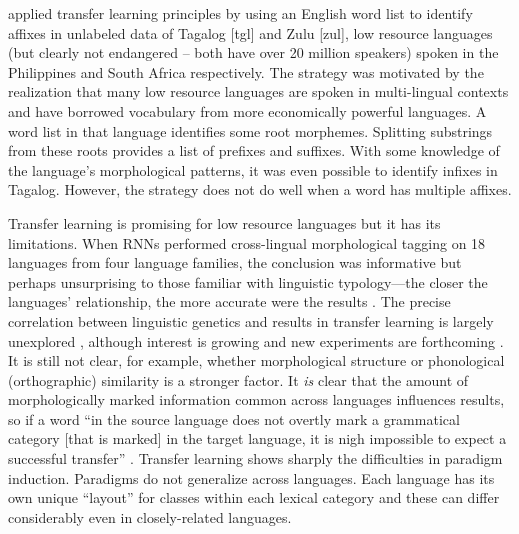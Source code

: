 \documentclass[12pt]{article}
\begin{document}
 applied transfer learning principles by using an English word list to identify affixes in unlabeled data of Tagalog [tgl] and Zulu [zul], low resource languages (but clearly not endangered -- both have over 20 million speakers) spoken in the Philippines and South Africa respectively. The strategy was motivated by the realization that many low resource languages are spoken in multi-lingual contexts and have borrowed vocabulary from more economically powerful languages. A word list in that language identifies some root morphemes. Splitting substrings from these roots provides a list of prefixes and suffixes. With some knowledge of the language's morphological patterns, it was even possible to identify infixes in Tagalog. However, the strategy does not do well when a word has multiple affixes. 

Transfer learning is promising for low resource languages but it has its limitations. When RNNs performed cross-lingual morphological tagging on 18 languages from four language families, the conclusion was informative but perhaps unsurprising to those familiar with linguistic typology---the closer the languages' relationship, the more accurate were the results \cite{cotterell_cross-lingual_2017}. The precise correlation between linguistic genetics and results in transfer learning is largely unexplored \cite{buys_cross-lingual_2016,cotterell_cross-lingual_2017}, although interest is growing and new experiments are forthcoming \cite{sigmorphon2019}.  It is still not clear, for example, whether morphological structure or phonological (orthographic) similarity is a stronger factor. It \textit{is} clear that the amount of morphologically marked information common across languages influences results, so if a word ``in the source language does not overtly mark a grammatical category [that is marked] in the target language, it is nigh impossible to expect a successful transfer'' \cite[page749]{cotterell_cross-lingual_2017}. Transfer learning shows sharply the difficulties in paradigm induction.  Paradigms do not generalize across languages. Each language has its own unique ``layout'' for classes within each lexical category and these can differ considerably even in closely-related languages.
\end{document}
